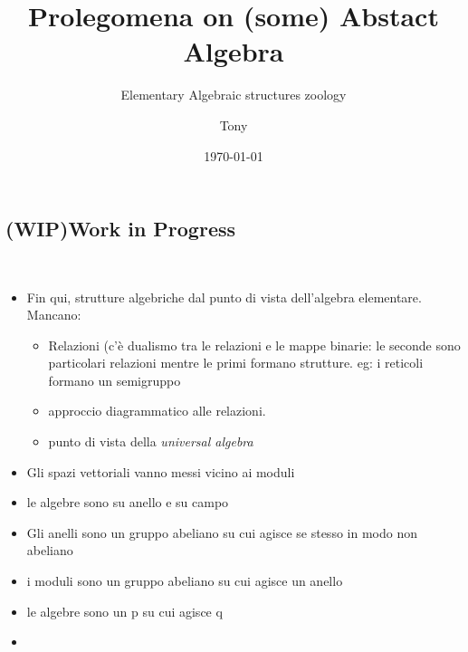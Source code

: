 \documentclass[a4paper,12pt]{scrartcl}    %
\begin{document}
\begin{landscape}
    \thispagestyle{empty}
    \noindent



	\title{Prolegomena on (some) Abstact Algebra}
	\subtitle{Elementary Algebraic structures zoology}
	\author{Tony}
	\date{\today}
\maketitle

	\begin{minipage}[c][\textheight]{0.30 \linewidth}
	    \section{(WIP)Work in Progress}
	    \mbox{}\\
		\begin{itemize}
			\item Fin qui, strutture algebriche dal punto di vista dell'algebra elementare. Mancano:
				\begin{itemize}
					\item Relazioni (c'è dualismo tra le relazioni e le mappe binarie: le seconde sono particolari relazioni mentre le primi formano strutture. eg: i reticoli formano un semigruppo
					\item approccio diagrammatico alle relazioni.
					\item punto di vista della \emph{universal algebra}
				\end{itemize}
			\item Gli spazi vettoriali vanno messi vicino ai moduli
			\item le algebre sono su anello e su campo
			\item Gli anelli sono un gruppo abeliano su cui agisce se stesso in modo non abeliano
			\item i moduli sono un gruppo abeliano su cui agisce un anello
			\item le algebre sono un p su cui agisce q
			\item 
		\end{itemize}	
	\end{minipage}
	\hspace{1cm}
	\begin{minipage}[t][]{0.60 \linewidth}

\end{minipage}
\end{landscape}
\end{document}
